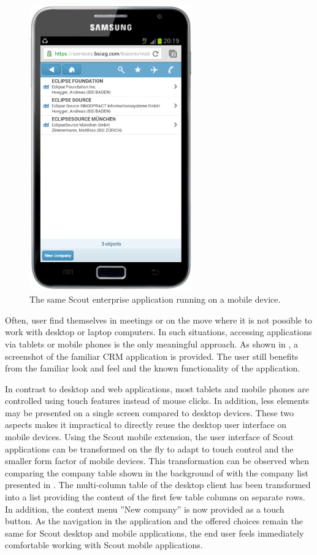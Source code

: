 \documentclass[a4paper,10pt,twoside]{book}
\begin{document}
\begin{figure}
\includegraphics[width=7cm]{bsi_crm_mobile_galaxy.png}
\caption{The same Scout enterprise application running on a mobile device.}
\end{figure}

Often, user find themselves in meetings or on the move where it is not possible to work with desktop or laptop computers.
In such situations, accessing applications via tablets or mobile phones is the only meaningful approach.
As shown in , a screenshot of the familiar CRM application is provided.
The user still benefits from the familiar look and feel and the known functionality of the application.

In contrast to desktop and web applications, most tablets and mobile phones are controlled using touch features instead of mouse clicks.
In addition, less elements may be presented on a single screen compared to desktop devices.
These two aspects makes it impractical to directly reuse the desktop user interface on mobile devices.
Using the Scout mobile extension, the user interface of Scout applications can be transformed on the fly to adapt to touch control and the smaller form factor of mobile devices.
This transformation can be observed when comparing the company table shown in the background of  with the company list presented in .
The multi-column table of the desktop client has been transformed into a list providing the content of the first few table columns on separate rows.
In addition, the context menu ''New company'' is now provided as a touch button.
As the navigation in the application and the offered choices remain the same for Scout desktop and mobile applications, the end user feels immediately comfortable working with Scout mobile applications.
\end{document}
